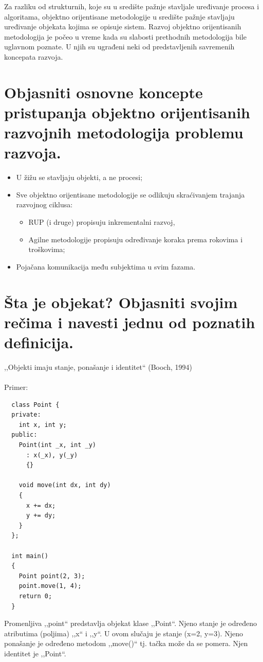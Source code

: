 \documentclass[a4paper]{article}
\begin{document}
  Za razliku od strukturnih, koje su u središte pažnje stavljale uređivanje procesa i algoritama, 
  objektno orijentisane metodologije u središte pažnje stavljaju uređivanje objekata kojima se opisuje 
  sistem. Razvoj objektno orijentisanih metodologija je počeo u vreme kada su slabosti prethodnih 
  metodologija bile uglavnom poznate. U njih su ugrađeni neki od predstavljenih savremenih koncepata 
  razvoja.

\section{Objasniti osnovne koncepte pristupanja objektno orijentisanih razvojnih metodologija 
         problemu razvoja.}
  \begin{itemize}
    \item U žižu se stavljaju objekti, a ne procesi;
    \item Sve objektno orijentisane metodologije se odlikuju skraćivanjem trajanja razvojnog ciklusa:
          \begin{itemize}
            \item RUP (i druge) propisuju inkrementalni razvoj,
            \item Agilne metodologije propisuju određivanje koraka prema rokovima i troškovima;
          \end{itemize}
    \item Pojačana komunikacija među subjektima u svim fazama.
  \end{itemize}


\section{Šta je objekat? Objasniti svojim rečima i navesti jednu od poznatih definicija.}
  ,,Objekti imaju stanje, ponašanje i identitet`` (Booch, 1994)\\\\
  Primer:
  \begin{lstlisting}
  class Point {
  private:
    int x, int y;
  public:
    Point(int _x, int _y)
      : x(_x), y(_y)
      {}

    void move(int dx, int dy)
    {
      x += dx;
      y += dy;
    }
  };

  int main()
  {
    Point point(2, 3);
    point.move(1, 4);
    return 0;
  }\end{lstlisting}
  Promenljiva ,,point`` predstavlja objekat klase ,,Point``. Njeno stanje je određeno
  atributima (poljima) ,,x`` i ,,y``. U ovom slučaju je stanje (x=2, y=3). Njeno ponašanje je 
  određeno metodom ,,move()`` tj. tačka može da se pomera. Njen identitet je ,,Point``.
\end{document}
